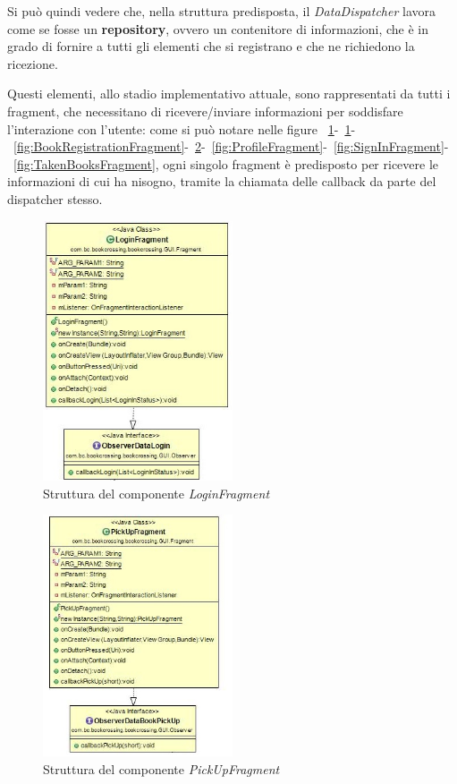 Si può quindi vedere che, nella struttura predisposta, il \textit{DataDispatcher} lavora come se fosse un \textbf{repository}, ovvero un contenitore di informazioni, che è in grado di fornire a tutti gli elementi che si registrano e che ne richiedono la ricezione.

Questi elementi, allo stadio implementativo attuale, sono rappresentati da tutti i fragment, che necessitano di ricevere/inviare informazioni per soddisfare l'interazione con l'utente: come si può notare nelle figure ~\ref{fig:LoginFragment}-~\ref{fig:LoginFragment}-~\ref{fig:BookRegistrationFragment}-~\ref{fig:PickUpFragment}-~\ref{fig:ProfileFragment}-~\ref{fig:SignInFragment}-~\ref{fig:TakenBooksFragment}, ogni singolo fragment è predisposto per ricevere le informazioni di cui ha nisogno, tramite la chiamata delle callback da parte del dispatcher stesso.

\begin{figure}[h!]
	\includegraphics[width=0.5\textwidth]{Immagini/LoginFragment}
	\caption{Struttura del componente \textit{LoginFragment}}
	\label{fig:LoginFragment}
\end{figure}

\begin{figure}[h!]
	\includegraphics[width=0.5\textwidth]{Immagini/PickUpFragment}
	\caption{Struttura del componente \textit{PickUpFragment}}
	\label{fig:PickUpFragment}
\end{figure}

